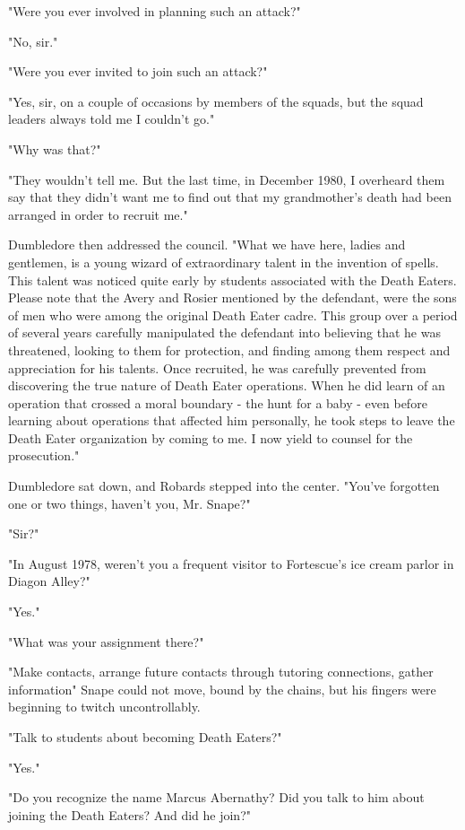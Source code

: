 "Were you ever involved in planning such an attack?"

"No, sir."

"Were you ever invited to join such an attack?"

"Yes, sir, on a couple of occasions by members of the squads, but the squad leaders always told me I couldn't go."

"Why was that?"

"They wouldn't tell me. But the last time, in December 1980, I overheard them say that they didn't want me to find out that my grandmother's death had been arranged in order to recruit me."

Dumbledore then addressed the council. "What we have here, ladies and gentlemen, is a young wizard of extraordinary talent in the invention of spells. This talent was noticed quite early by students associated with the Death Eaters. Please note that the Avery and Rosier mentioned by the defendant, were the sons of men who were among the original Death Eater cadre. This group over a period of several years carefully manipulated the defendant into believing that he was threatened, looking to them for protection, and finding among them respect and appreciation for his talents. Once recruited, he was carefully prevented from discovering the true nature of Death Eater operations. When he did learn of an operation that crossed a moral boundary - the hunt for a baby - even before learning about operations that affected him personally, he took steps to leave the Death Eater organization by coming to me. I now yield to counsel for the prosecution."

Dumbledore sat down, and Robards stepped into the center. "You've forgotten one or two things, haven't you, Mr. Snape?"

"Sir?"

"In August 1978, weren't you a frequent visitor to Fortescue's ice cream parlor in Diagon Alley?"

"Yes."

"What was your assignment there?"

"Make contacts, arrange future contacts through tutoring connections, gather information{\el}" Snape could not move, bound by the chains, but his fingers were beginning to twitch uncontrollably.

"Talk to students about becoming Death Eaters?"

"Yes."

"Do you recognize the name Marcus Abernathy? Did you talk to him about joining the Death Eaters? And did he join?"

